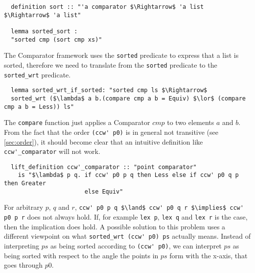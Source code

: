 \begin{lstlisting}
  definition sort :: "'a comparator $\Rightarrow$ 'a list $\Rightarrow$ 'a list"

  lemma sorted_sort :
  "sorted cmp (sort cmp xs)"
\end{lstlisting}
The Comparator framework uses the \lstinline|sorted| predicate to express that a list is 
sorted, therefore we need to translate from the \lstinline|sorted| predicate to
the \lstinline|sorted_wrt| predicate.
\begin{lstlisting}
  lemma sorted_wrt_if_sorted: "sorted cmp ls $\Rightarrow$ 
  sorted_wrt ($\lambda$ a b.(compare cmp a b = Equiv) $\lor$ (compare cmp a b = Less)) ls" 
\end{lstlisting}
The \lstinline|compare| function just applies a Comparator $cmp$ to two elements $a$ and $b$. 
From the fact that the order \lstinline|(ccw' p0)| is in general not transitive (see \ref*{sec:order}),
it should become clear that an intuitive definition like \lstinline|ccw'_comparator| will not work.
\begin{lstlisting}
  lift_definition ccw'_comparator :: "point comparator" 
    is "$\lambda$ p q. if ccw' p0 p q then Less else if ccw' p0 q p then Greater 
                       else Equiv"
\end{lstlisting}
For arbitrary $p$, $q$ and $r$, \lstinline|ccw' p0 p q $\land$ ccw' p0 q r $\implies$ ccw' p0 p r|
does not always hold. If, for example \lstinline|lex p|, \lstinline|lex q| and \lstinline|lex r| is the case,
then the implication does hold. A possible solution to this problem uses a different viewpoint on 
what \lstinline|sorted_wrt (ccw' p0) ps| actually means. Instead of interpreting $ps$ as being sorted
according to \lstinline|(ccw' p0)|, we can interpret $ps$ as being sorted with respect to the angle 
the points in $ps$ form with the x-axis, that goes through $p0$.

